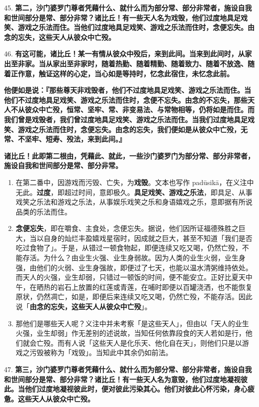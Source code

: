 {\Large 45.} \textbf{第二，沙门婆罗门尊者凭藉什么、就什么而为部分常、部分非常者，施设自我和世间部分是常、部分非常？诸比丘！有一些天人名为戏毁，他们过度地具足戏笑、游戏之乐法而住。当他们过度地具足戏笑、游戏之乐法而住时，念便忘失。由念的忘失，这些天人从彼众中亡殁。}

{\Large 46.} \textbf{有这可能，诸比丘！某一有情从彼众中殁后，来到此间。当来到此间时，从家出至非家。当从家出至非家时，随着热勤、随着精勤、随着致力、随着不放逸、随着正作意，触证这样的心定，当心如是等持时，忆念此宿住，未忆念此前。}

\textbf{他便如是说：『那些尊天非戏毁者，他们不过度地具足戏笑、游戏之乐法而住。当他们不过度地具足戏笑、游戏之乐法而住时，念便不忘失。由念的不忘失，那些天人不从彼众中亡殁，恒常、坚牢、常、非变易法、与常物相等，仍将如是而住。而我们曾是戏毁者，我们曾过度地具足戏笑、游戏之乐法而住。当我们过度地具足戏笑、游戏之乐法而住时，念便忘失。由念的忘失，我们便如是从彼众中亡殁，无常、不坚牢、短寿、殁法，来到此间。』}

\textbf{诸比丘！此即第二根由，凭藉此、就此，一些沙门婆罗门为部分常、部分非常者，施设自我和世间部分是常、部分非常。}

\begin{enumerate}\item 在第二番中，因游戏而污毁、亡失，为\textbf{戏毁}。文本也写作 padūsikā，在义注中无此。\textbf{过度}，即超过时间，意即极久。\textbf{具足戏笑、游戏之乐法}，即具足、从事戏笑之乐法和游戏之乐法，从事娱乐戏笑之乐和身语嬉戏之乐，意即据有所说品类的乐法而住。
\item \textbf{念便忘失}，即在嚼食、主食处，念便忘失。据说，他们因所证福德殊胜之巨大，当以自身的灿烂丰盈嬉戏星宿时，因成就之巨大，甚至不知道「我们是否吃过食物了」。于是，从错过一顿食物起，即便连续又吃又喝，仍然亡殁，不能存活。为什么？由业生火强、业生身弱故。因为人类的业生火弱，业生身强，由他们的火弱、业生身强故，即便过了七天，也能以温水清粥维持依处。而天人的火强，业生却弱，只错过一顿饭的时间，便不能安立。正好比夏天中午，在晒热的岩石上放置的红莲或青莲，在哺时即便以百罐浇洒，也不能恢复原状，仍然凋亡，如是，即便后来连续又吃又喝，仍然亡殁，不能存活。因此说「\textbf{由念的忘失，这些天人从彼众中亡殁}」。
\item 那他们是哪些天人呢？义注中并未考察「是这些天人」，但由以「天人的业生火强，业生却弱」作无差别的述说故，当知任何依靠段食的天人若如是行，他们就会亡殁。而有人说「这些天人是化乐天、他化自在天」，则他们只是以游戏之污毁被称为「戏毁」。当知此中其余仍如前法。\end{enumerate}

{\Large 47.} \textbf{第三，沙门婆罗门尊者凭藉什么、就什么而为部分常、部分非常者，施设自我和世间部分是常、部分非常？诸比丘！有一些天人名为意毁，他们过度地凝视彼此。当他们过度地凝视彼此时，便对彼此污染其心。他们对彼此心怀污染，身心疲惫。这些天人从彼众中亡殁。}

